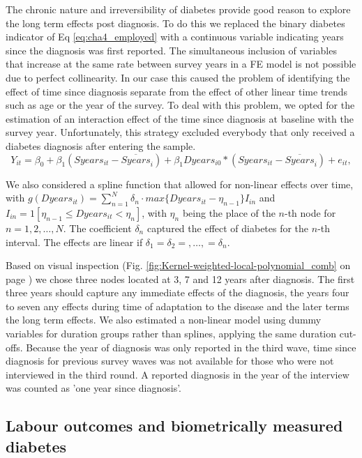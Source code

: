 \documentclass[12pt,english]{article}
\begin{document}
The chronic nature and irreversibility of diabetes provide good reason to explore the long term effects post diagnosis.  To do this we replaced the binary diabetes indicator of Eq \ref{eq:cha4_employed} with a continuous variable indicating years since the diagnosis was first reported. The simultaneous inclusion of variables that increase at the same rate between survey years in a \ac{FE} model is not possible due to perfect collinearity. In our case this caused the problem of identifying the effect of time since diagnosis separate from the effect of other linear time trends such as age or the year of the survey.  To deal with this problem, we opted for the estimation of an interaction effect of the time since diagnosis at baseline with the survey year. Unfortunately, this strategy excluded everybody that only received a diabetes diagnosis after entering the sample.
\begin{equation}
Y_{it}=\beta_{0}+\beta_{1}(Syears_{it}-\overline{Syears}_i)+\beta_{1}Dyears_{i0}*(Syears_{it}-\overline{Syears}_i)+e_{it},\label{eq:cha4_employed}
\end{equation}

We also considered a spline function that allowed for non-linear effects over time, with $g(Dyears_{it})=\sum_{n=1}^{N}\delta_{n}\cdot max\{Dyears_{it}-\eta_{n-1}\}I_{in}$
and $I_{in}=1[\eta_{n-1}\leq Dyears_{it}<\eta_{n}]$, with $\eta_{n}$ being the place of the $n$-th node for $n=1,2,\ldots,N$. The coefficient $\delta_{n}$ captured the effect of diabetes for the $n$-th interval. The effects are linear if $\delta_{1}=\delta_{2}=,\ldots,=\delta_{n}$.

Based on visual inspection (Fig. \ref{fig:Kernel-weighted-local-polynomial_comb} on page \pageref{fig:Kernel-weighted-local-polynomial_comb}) we chose three nodes located at 3, 7 and 12 years after diagnosis. The first three years should capture any immediate effects of the diagnosis, the years four to seven any effects during time of adaptation to the disease and the later terms the long term effects. We also estimated a non-linear model using dummy variables for duration groups rather than splines, applying the same duration cut-offs. Because the year of diagnosis was only reported in the third wave, time since diagnosis for previous survey waves was not available for those who were not interviewed in the third round.  A reported diagnosis in the year of the interview was counted as 'one year since diagnosis'.

\subsection{\label{sec:Biomarker Strategy}Labour outcomes and biometrically measured diabetes}
\end{document}
